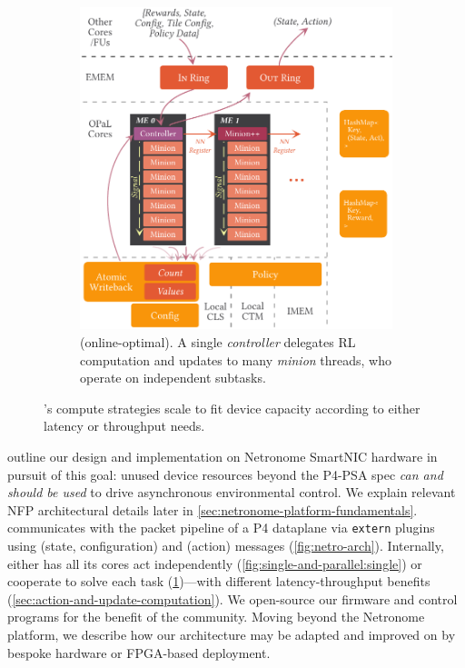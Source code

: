 \begin{figure}
	\begin{subfigure}{\linewidth}
		\centering
		\includegraphics[keepaspectratio, width=0.8\linewidth]{diagrams/opal/coop}
		\caption{\Coopfw{} (online-optimal). A single \emph{controller} delegates RL computation and updates to many \emph{minion} threads, who operate on independent subtasks.\label{fig:single-and-parallel:parallel}}
	\end{subfigure}
	\caption{\approachshort{}'s compute strategies scale to fit device capacity according to either latency or throughput needs.\label{fig:single-and-parallel}}
\end{figure}

 outline our design and implementation on Netronome SmartNIC hardware in pursuit of this goal: unused device resources beyond the P4-PSA spec \emph{can and should be used} to drive asynchronous environmental control.
We explain relevant NFP architectural details later in \cref{sec:netronome-platform-fundamentals}.
\approachshort{} communicates with the packet pipeline of a P4 dataplane via \texttt{extern} plugins using \inring{} (state, configuration) and \outring{} (action) messages (\cref{fig:netro-arch}).
Internally, \approachshort{} either has all its cores act independently (\cref{fig:single-and-parallel:single}) or cooperate to solve each task (\cref{fig:single-and-parallel:parallel})---with different latency-throughput benefits (\cref{sec:action-and-update-computation}).
We open-source our firmware and control programs for the benefit of the community.
Moving beyond the Netronome platform, we describe how our architecture may be adapted and improved on by bespoke hardware or FPGA-based deployment.

